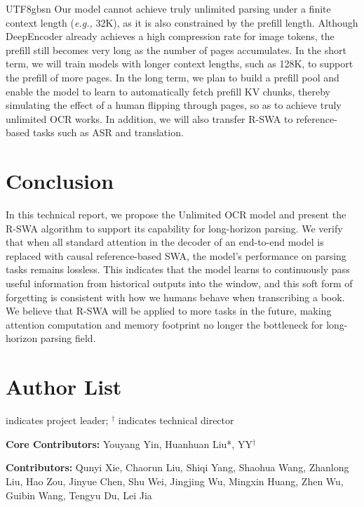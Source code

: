 \documentclass[11pt, a4paper, logo, copyright, nonumbering]{deepseek}
\begin{document}
\begin{CJK*}{UTF8}{gbsn}
Our model cannot achieve truly unlimited parsing under a finite context length (\textit{e.g.,} 32K), as it is also constrained by the prefill length. Although DeepEncoder already achieves a high compression rate for image tokens, the prefill still becomes very long as the number of pages accumulates. In the short term, we will train models with longer context lengths, such as 128K, to support the prefill of more pages. In the long term, we plan to build a prefill pool and enable the model to learn to automatically fetch prefill KV chunks, thereby simulating the effect of a human flipping through pages, so as to achieve truly unlimited OCR works. In addition, we will also transfer R-SWA to reference-based tasks such as ASR and translation.




\section{Conclusion}
In this technical report, we propose the Unlimited OCR model and present the R-SWA algorithm to support its capability for long-horizon parsing. We verify that when all standard attention in the decoder of an end-to-end model is replaced with causal reference-based SWA, the model's performance on parsing tasks remains lossless. This indicates that the model learns to continuously pass useful information from historical outputs into the window, and this soft form of forgetting is consistent with how we humans behave when transcribing a book. We believe that R-SWA will be applied to more tasks in the future, making attention computation and memory footprint no longer the bottleneck for long-horizon parsing field.


\section{Author List}

\noindent * indicates project leader; $^\dag$ indicates technical director


\noindent \textbf{Core Contributors:} Youyang Yin, Huanhuan Liu*, YY$^\dag$

\noindent \textbf{Contributors:} Qunyi Xie, Chaorun Liu, Shiqi Yang, Shaohua Wang, Zhanlong Liu, Hao Zou, Jinyue Chen, Shu Wei, Jingjing Wu, Mingxin Huang, Zhen Wu, Guibin Wang, Tengyu Du,  Lei Jia 






% 





\end{CJK*}
\end{document}
